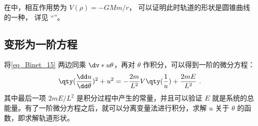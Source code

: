 在中，相互作用势为 $V(\rho)=-GMm/r$， 可以证明此时轨道的形状是圆锥曲线的一种， 详见 “”。

\subsection{变形为一阶方程}
将\autoref{eq_Binet_15} 两边同乘 $\dv*{u}{\theta}$，再对 $\theta$ 作积分，可以得到一阶的微分方程：
\begin{equation}\label{eq_Binet_3}
\qty(\frac{\dd u}{\dd \theta})^2+u^2=-\frac{2m}{L^2}V\qty(\frac{1}{u})+\frac{2 m E}{L^2}~.
\end{equation}
其中最后一项 $2mE/L^2$ 是积分过程中产生的常量，并且可以验证 $E$ 就是系统的总能量。有了一阶微分方程之后，就可以分离变量法进行积分，求解 $u$ 关于 $\theta$ 的函数，即求解轨道形状。
